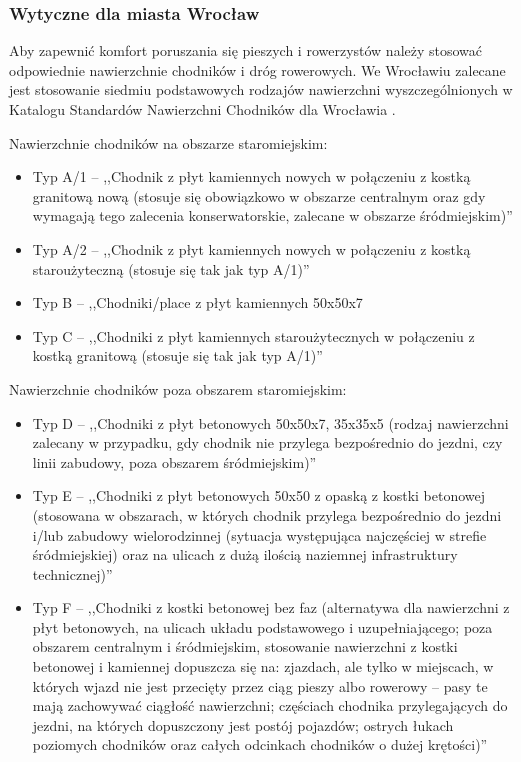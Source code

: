 \documentclass[twoside,12pt]{article}
\begin{document}
	 \subsubsection{Wytyczne dla miasta Wrocław}
	 
	 Aby zapewnić komfort poruszania się pieszych i rowerzystów należy stosować odpowiednie nawierzchnie chodników i dróg rowerowych. We Wrocławiu zalecane jest stosowanie siedmiu podstawowych rodzajów nawierzchni wyszczególnionych w Katalogu Standardów Nawierzchni Chodników dla Wrocławia \cite{standardy_chodnik}.

\begin{samepage}
Nawierzchnie chodników na obszarze staromiejskim:
	 \begin{itemize}\setlength{\itemsep}{0em}
	 \item Typ A/1 -- ,,Chodnik z płyt kamiennych nowych w połączeniu z kostką granitową nową (stosuje się obowiązkowo w obszarze centralnym oraz gdy wymagają tego zalecenia konserwatorskie, zalecane w obszarze śródmiejskim)'' \cite{standardy_wroclaw}
	 \item Typ A/2 -- ,,Chodnik z płyt kamiennych nowych w połączeniu z kostką staroużyteczną (stosuje się tak jak typ A/1)'' \cite{standardy_wroclaw}
	 \item Typ B -- ,,Chodniki/place z płyt kamiennych 50x50x7
	 \item Typ C -- ,,Chodniki z płyt kamiennych staroużytecznych w połączeniu z kostką granitową (stosuje się tak jak typ A/1)'' \cite{standardy_wroclaw}
	 \end{itemize}\end{samepage}
	 
	 \begin{samepage}
Nawierzchnie chodników poza obszarem staromiejskim:
	 \begin{itemize}\setlength{\itemsep}{0em}
	 \item Typ D -- ,,Chodniki z płyt betonowych 50x50x7, 35x35x5 (rodzaj nawierzchni zalecany w przypadku, gdy chodnik nie przylega bezpośrednio do jezdni, czy linii zabudowy, poza obszarem śródmiejskim)'' \cite{standardy_wroclaw}
	 \item Typ E -- ,,Chodniki z płyt betonowych 50x50 z opaską z kostki betonowej (stosowana w obszarach, w których chodnik przylega bezpośrednio do jezdni i/lub zabudowy wielorodzinnej (sytuacja występująca najczęściej w strefie śródmiejskiej) oraz na ulicach z dużą ilością naziemnej infrastruktury technicznej)'' \cite{standardy_wroclaw}
	 \item Typ F -- ,,Chodniki z kostki betonowej bez faz (alternatywa dla nawierzchni z płyt betonowych, na ulicach układu podstawowego i uzupełniającego; poza obszarem centralnym i śródmiejskim, stosowanie nawierzchni z kostki betonowej i kamiennej dopuszcza się na:
zjazdach, ale tylko w miejscach, w których wjazd nie jest przecięty przez ciąg pieszy albo rowerowy -- pasy te mają zachowywać ciągłość nawierzchni; częściach chodnika przylegających do jezdni, na których dopuszczony jest postój pojazdów; ostrych łukach poziomych chodników oraz całych odcinkach chodników o dużej krętości)'' \cite{standardy_wroclaw}
	 \end{itemize}\end{samepage}
	 
\end{document}
